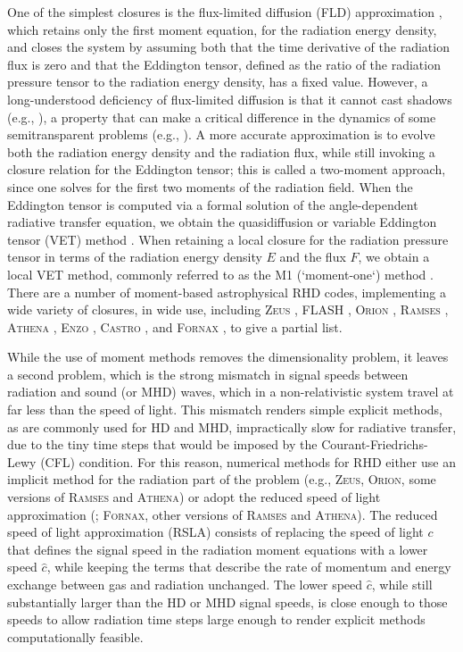 \documentclass[fleqn,usenatbib]{mnras}
\begin{document}
One of the simplest closures is the flux-limited diffusion (FLD) approximation \citep{Alme_1973}, which retains only the first moment equation, for the radiation energy density, and closes the system by assuming both that the time derivative of the radiation flux is zero and that the Eddington tensor, defined as the ratio of the radiation pressure tensor to the radiation energy density, has a fixed value. However, a long-understood deficiency of flux-limited diffusion is that it cannot cast shadows (e.g., \citealt{Hayes_2003}), a property that can make a critical difference in the dynamics of some semitransparent problems (e.g., \citealt{Davis_2014}). A more accurate approximation is to evolve both the radiation energy density and the radiation flux, while still invoking a closure relation for the Eddington tensor; this is called a two-moment approach, since one solves for the first two moments of the radiation field. When the Eddington tensor is computed via a formal solution of the angle-dependent radiative transfer equation, we obtain the quasidiffusion or variable Eddington tensor (VET) method \citep{Goldin_1964}. When retaining a local closure for the radiation pressure tensor in terms of the radiation energy density $E$ and the flux $F$, we obtain a local VET method, commonly referred to as the M1 (`moment-one`) method \citep{Minerbo_1978,Levermore_1984,Dubroca_1999,Gonzalez_2007}. There are a number of moment-based astrophysical RHD codes, implementing a wide variety of closures, in wide use, including \textsc{Zeus} \citep{Turner_2001}, \textsc{FLASH} \citep{Fryxell_2000}, \textsc{Orion} \citep{Krumholz_2007, Shestakov08a, Li21a}, \textsc{Ramses} \citep{Commercon11a, Rosdahl_2013}, \textsc{Athena} \citep{Davis_2012, Jiang12a}, \textsc{Enzo} \citep{Reynolds_2009,Bryan_2014}, \textsc{Castro} \citep{Zhang_2011,Zhang_2013,Almgren_2020}, and \textsc{Fornax} \citep{Skinner_2019}, to give a partial list.

While the use of moment methods removes the dimensionality problem, it leaves a second problem, which is the strong mismatch in signal speeds between radiation and sound (or MHD) waves, which in a non-relativistic system travel at far less than the speed of light. This mismatch renders simple explicit methods, as are commonly used for HD and MHD, impractically slow for radiative transfer, due to the tiny time steps that would be imposed by the Courant-Friedrichs-Lewy (CFL) condition. For this reason, numerical methods for RHD either use an implicit method for the radiation part of the problem (e.g., \textsc{Zeus}, \textsc{Orion}, some versions of \textsc{Ramses} and \textsc{Athena}) or adopt the reduced speed of light approximation (\citealt{Gnedin_2001, Skinner_2013}; \textsc{Fornax}, other versions of \textsc{Ramses} and \textsc{Athena}). The reduced speed of light approximation (RSLA) consists of replacing the speed of light $c$ that defines the signal speed in the radiation moment equations with a lower speed $\hat{c}$, while keeping the terms that describe the rate of momentum and energy exchange between gas and radiation unchanged. The lower speed $\hat{c}$, while still substantially larger than the HD or MHD signal speeds, is close enough to those speeds to allow radiation time steps large enough to render explicit methods computationally feasible.
\end{document}
